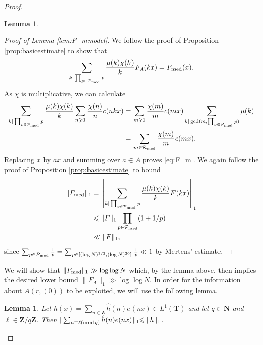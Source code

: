 \documentclass[11pt, reqno]{amsart}
\newtheorem{lemma}[theorem]{Lemma}
\newcommand{\mdsublem}[1]{\ensuremath{(\mbox{\scriptsize \textup{mod}}\, #1)}}
\begin{document}
\begin{proof}
\begin{lemma}
    \end{lemma}
    \begin{proof}[Proof of Lemma \ref{lem:F_mmodel}]
        We follow the proof of Proposition \ref{prop:basicestimate} to show that \begin{equation}\label{eq:F_m}\sum_{k|\prod_{p\in\mathcal{P}_\textnormal{med}}p}\frac{\mu(k)\chi(k)}{k}F_A(kx)=F_\textnormal{med}(x).
        \end{equation} As $\chi$ is multiplicative, we can calculate
    \begin{align*}
        \sum_{k|\prod_{p\in\mathcal{P}_\textnormal{med}}p}\frac{\mu(k)\chi(k)}{k}\sum_{n\geqslant 1}\frac{\chi(n)}{n}c (nkx)
        &=\sum_{m\geqslant 1}\frac{\chi(m)}{m}c (mx)\sum_{k|\gcd(m,\prod_{p\in\mathcal{P}_\textnormal{med}}p)}\mu(k)\\
        &= \sum_{m\in\mathcal{R}_\textnormal{med}}\frac{\chi(m)}{m}c( mx).
    \end{align*}
    Replacing $x$ by $ax$ and summing over $a\in A$ proves \eqref{eq:F_m}. We again follow the proof of Proposition \ref{prop:basicestimate} to bound
    \begin{align*}
        \lVert F_\textnormal{med}\rVert_1&=\left\lVert \sum_{k|\prod_{p\in\mathcal{P}_\textnormal{med}}p}\frac{\mu(k)\chi(k)}{k}F(kx)\right\rVert_1\\
        &\leqslant \lVert F\rVert_1\prod_{p\in\mathcal{P}_\textnormal{med}}(1+1/p)\\
        &\ll \lVert F\rVert_1,
    \end{align*}
    since $\sum_{p\in\mathcal{P}_\textnormal{med}}\frac{1}{p}=\sum_{p\in[(\log N)^{1/2},(\log N)^{20}]}\frac{1}{p}\ll 1$ by Mertens' estimate.
    \end{proof}
    We will show that $\lVert F_\textnormal{med}\rVert_1\gg \log\log N$ which, by the lemma above, then implies the desired lower bound $\lVert F_A\lVert_1\gg \log \log N$. In order for the information about $A(r,(0))$ to be exploited, we will use the following lemma.
    \begin{lemma}\label{lem:L^1projection}
    Let $h(x)=\sum_{n\in\mathbf{Z}}\hat{h}(n)e(nx)\in L^1(\mathbf{T})$ and let $q\in\mathbf{N}$ and $\ell\in \mathbf{Z}/q\mathbf{Z}$. Then $\lVert \sum_{n\equiv\ell\mdsublem q}\hat{h}(n)e(nx)\lVert_1\leqslant \lVert h\rVert_1$.
        

\end{lemma}
\end{proof}
\end{document}
